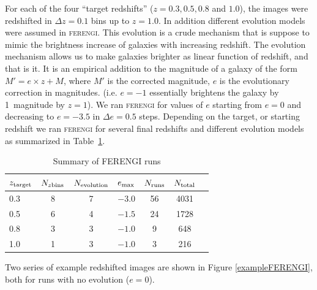 \documentclass[usenatbib]{mn2e}
\newcommand{\ferengi}{\textsc{ferengi}}
\begin{document}
For each of the four ``target redshifts'' ($z = 0.3, 0.5, 0.8$ and $1.0$), the images were redshifted in $\Delta z = 0.1$ bins up to $z=1.0$. In addition different evolution models were assumed in \ferengi{}. This evolution is a crude mechanism that is suppose to mimic the brightness increase of galaxies with increasing redshift. The evolution mechanism allows us to make galaxies brighter as linear function of redshift, and that is it. It is an empirical addition to the magnitude of a galaxy of the form $M' = e\times z + M$, where $M'$ is the corrected magnitude, $e$ is the evolutionary correction in magnitudes.  (i.e. $e=-1$ essentially brightens the galaxy by 1~magnitude by $z=1$). We ran \ferengi{} for values of $e$ starting from $e=0$ and decreasing to $e=-3.5$ in $\Delta e = 0.5$ steps. Depending on the target, or starting redshift we ran \ferengi{} for several final redshifts and different evolution models as summarized in Table~\ref{ferengivalues}. 

\begin{table}
\caption{Summary of FERENGI runs \label{ferengivalues}}
\begin{tabular}{lcccccc}
\hline\hline
$z_{\rm target}$ & $N_{z {\rm bins}}$ & $N_{\rm evolution}$ & $e_{\rm max}$ & $N_{\rm runs}$ & $N_{\rm total}$\\
\hline
0.3              & 8                  & 7                   & $-3.0$        & 56             & 4031 \\
0.5              & 6                  & 4                   & $-1.5$        & 24             & 1728 \\
0.8              & 3                  & 3                   & $-1.0$        &  9             &  648 \\
1.0              & 1                  & 3                   & $-1.0$        &  3             &  216 \\
\hline\hline
\end{tabular}
\end{table}

Two series of example redshifted images are shown in Figure \ref{exampleFERENGI}, both for runs with no evolution ($e=0$). 
\end{document}
